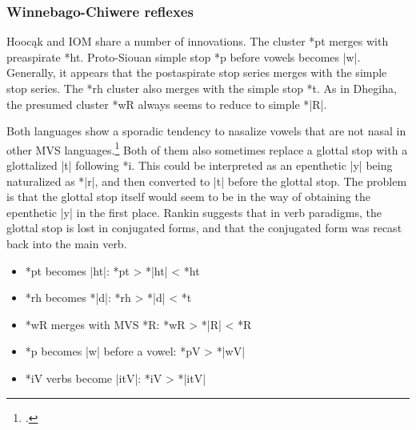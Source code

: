 \documentclass[output=paper]{LSP/langsci}
\begin{document}
\subsubsection{Winnebago-Chiwere reflexes}

Hooc\k{a}k and IOM share a number of innovations.  The cluster *pt merges with preaspirate *ht.  Proto-Siouan simple stop *p before vowels becomes |w|.  Generally, it appears that the postaspirate stop series merges with the simple stop series.  The *rh cluster also merges with the simple stop *t.  As in Dhegiha, the presumed cluster *wR always seems to reduce to simple *|R|.  

Both languages show a sporadic tendency to nasalize vowels that are not nasal in other MVS languages.\footnote{\citealt[50]{CSD2006}.} Both of them also sometimes replace a glottal stop with a glottalized |t\textsuperscript{}| following *i.  This could be interpreted as an epenthetic |y| being naturalized as *|r|, and then converted to |t| before the glottal stop.  The problem is that the glottal stop itself would seem to be in the way of obtaining the epenthetic |y| in the first place.  Rankin suggests that in verb paradigms, the glottal stop is lost in conjugated forms, and that the conjugated form was recast back into the main verb.

\begin{itemize}
\item *pt becomes |ht|: \hspace{7em} *pt	>	*|ht|	<	*ht
\item *rh becomes *|d|: \hspace{7em} *rh	>	*|d|	<	*t
\item *wR merges with MVS *R: \hspace{3em} *wR	>	*|R|	<	*R
\item *p becomes |w| before a vowel: \hspace{1em} *pV	>	*|wV|
\item *i\textsuperscript{}V verbs become |it\textsuperscript{}V|:	\hspace{4em} *i\textsuperscript{}V	>	*|it\textsuperscript{}V|
\end{itemize}
 
\end{document}
